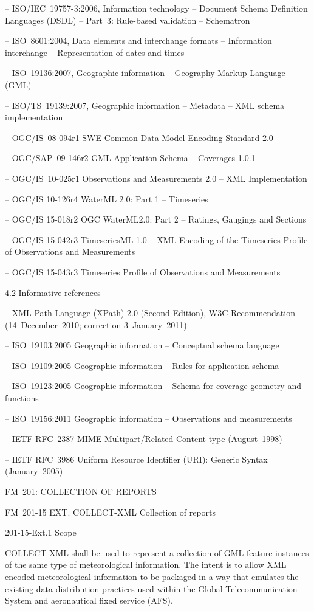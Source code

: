 -- ISO/IEC~19757-3:2006, Information technology -- Document Schema Definition Languages (DSDL) -- Part~3: Rule-based validation -- Schematron

-- ISO~8601:2004, Data elements and interchange formats -- Information interchange -- Representation of dates and times

-- ISO~19136:2007, Geographic information -- Geography Markup Language (GML)

-- ISO/TS~19139:2007, Geographic information -- Metadata -- XML schema implementation

-- OGC/IS~08-094r1 SWE Common Data Model Encoding Standard 2.0

-- OGC/SAP~09-146r2 GML Application Schema -- Coverages 1.0.1

-- OGC/IS~10-025r1 Observations and Measurements 2.0 -- XML Implementation

-- OGC/IS 10-126r4 WaterML 2.0: Part 1 -- Timeseries

-- OGC/IS 15-018r2 OGC WaterML2.0: Part 2 -- Ratings, Gaugings and Sections

-- OGC/IS 15-042r3 TimeseriesML 1.0 -- XML Encoding of the Timeseries Profile of Observations and Measurements

-- OGC/IS 15-043r3 Timeseries Profile of Observations and Measurements

4.2 Informative references

-- XML Path Language (XPath) 2.0 (Second Edition), W3C Recommendation (14~December~2010; correction 3~January~2011)

-- ISO~19103:2005 Geographic information -- Conceptual schema language

-- ISO~19109:2005 Geographic information -- Rules for application schema

-- ISO~19123:2005 Geographic information -- Schema for coverage geometry and functions

-- ISO~19156:2011 Geographic information -- Observations and measurements

-- IETF RFC~2387 MIME Multipart/Related Content-type (August~1998)

-- IETF RFC~3986 Uniform Resource Identifier (URI): Generic Syntax (January~2005)

FM~201: COLLECTION OF REPORTS

FM~201-15 EXT. COLLECT-XML Collection of reports

201-15-Ext.1 Scope

COLLECT-XML shall be used to represent a collection of GML feature instances of the same type of meteorological information. The intent is to allow XML encoded meteorological information to be packaged in a way that emulates the existing data distribution practices used within the Global Telecommunication System and aeronautical fixed service (AFS).

